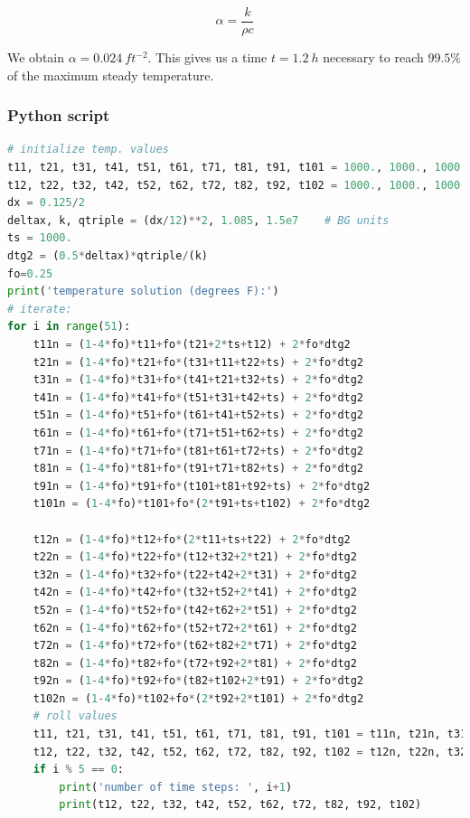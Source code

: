\begin{equation}\label{eq720}
\alpha = \frac{k}{\rho c}
\end{equation}

We obtain $\alpha = 0.024\ ft^{-2}$. This gives us a time $t = 1.2\ h$ necessary to reach $99.5\%$ of the maximum steady temperature.

\newpage
\subsubsection{Python script}
\label{py2}
\begin{lstlisting}[language=python]
# initialize temp. values
t11, t21, t31, t41, t51, t61, t71, t81, t91, t101 = 1000., 1000., 1000., 1000., 1000., 1000., 1000., 1000., 1000., 1000.
t12, t22, t32, t42, t52, t62, t72, t82, t92, t102 = 1000., 1000., 1000., 1000., 1000., 1000., 1000., 1000., 1000., 1000.
dx = 0.125/2
deltax, k, qtriple = (dx/12)**2, 1.085, 1.5e7    # BG units
ts = 1000.
dtg2 = (0.5*deltax)*qtriple/(k)
fo=0.25
print('temperature solution (degrees F):')
# iterate:
for i in range(51):
    t11n = (1-4*fo)*t11+fo*(t21+2*ts+t12) + 2*fo*dtg2
    t21n = (1-4*fo)*t21+fo*(t31+t11+t22+ts) + 2*fo*dtg2
    t31n = (1-4*fo)*t31+fo*(t41+t21+t32+ts) + 2*fo*dtg2
    t41n = (1-4*fo)*t41+fo*(t51+t31+t42+ts) + 2*fo*dtg2
    t51n = (1-4*fo)*t51+fo*(t61+t41+t52+ts) + 2*fo*dtg2
    t61n = (1-4*fo)*t61+fo*(t71+t51+t62+ts) + 2*fo*dtg2
    t71n = (1-4*fo)*t71+fo*(t81+t61+t72+ts) + 2*fo*dtg2
    t81n = (1-4*fo)*t81+fo*(t91+t71+t82+ts) + 2*fo*dtg2
    t91n = (1-4*fo)*t91+fo*(t101+t81+t92+ts) + 2*fo*dtg2
    t101n = (1-4*fo)*t101+fo*(2*t91+ts+t102) + 2*fo*dtg2

    t12n = (1-4*fo)*t12+fo*(2*t11+ts+t22) + 2*fo*dtg2
    t22n = (1-4*fo)*t22+fo*(t12+t32+2*t21) + 2*fo*dtg2
    t32n = (1-4*fo)*t32+fo*(t22+t42+2*t31) + 2*fo*dtg2
    t42n = (1-4*fo)*t42+fo*(t32+t52+2*t41) + 2*fo*dtg2
    t52n = (1-4*fo)*t52+fo*(t42+t62+2*t51) + 2*fo*dtg2
    t62n = (1-4*fo)*t62+fo*(t52+t72+2*t61) + 2*fo*dtg2
    t72n = (1-4*fo)*t72+fo*(t62+t82+2*t71) + 2*fo*dtg2
    t82n = (1-4*fo)*t82+fo*(t72+t92+2*t81) + 2*fo*dtg2
    t92n = (1-4*fo)*t92+fo*(t82+t102+2*t91) + 2*fo*dtg2
    t102n = (1-4*fo)*t102+fo*(2*t92+2*t101) + 2*fo*dtg2
    # roll values
    t11, t21, t31, t41, t51, t61, t71, t81, t91, t101 = t11n, t21n, t31n, t41n, t51n, t61n, t71n, t81n, t91n, t101n
    t12, t22, t32, t42, t52, t62, t72, t82, t92, t102 = t12n, t22n, t32n, t42n, t52n, t62n, t72n, t82n, t92n, t102n
    if i % 5 == 0:
        print('number of time steps: ', i+1)
        print(t12, t22, t32, t42, t52, t62, t72, t82, t92, t102)
\end{lstlisting}
\newpage


